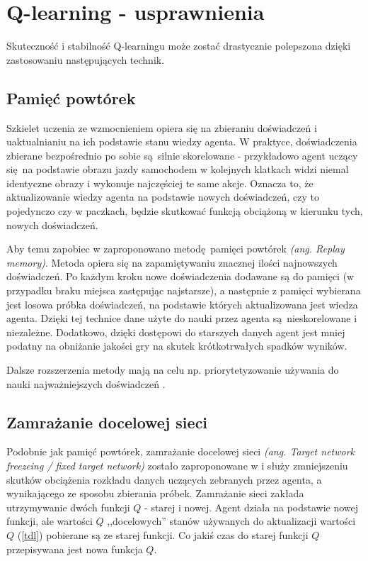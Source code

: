 \documentclass[polish,master,a4paper,oneside]{ppfcmthesis}
\begin{document}
 \section{Q-learning - usprawnienia}\label{enhancements}
Skuteczność i stabilność Q-learningu może zostać drastycznie polepszona dzięki zastosowaniu następujących technik.

\subsection{Pamięć powtórek}\label{replaymemory}

Szkielet uczenia ze wzmocnieniem opiera się na zbieraniu doświadczeń i uaktualnianiu na ich podstawie stanu wiedzy agenta. W praktyce, doświadczenia zbierane bezpośrednio po sobie są silnie skorelowane - przykładowo agent uczący się na podstawie obrazu jazdy samochodem w kolejnych klatkach widzi niemal identyczne obrazy i wykonuje najczęściej te same akcje. Oznacza to, że aktualizowanie wiedzy agenta na podstawie nowych doświadczeń, czy to pojedynczo czy w paczkach, będzie skutkować funkcją obciążoną w kierunku tych, nowych doświadczeń.

Aby temu zapobiec w \cite{mnih2015human} zaproponowano metodę pamięci powtórek \textit{(ang. Replay memory)}. Metoda opiera się na zapamiętywaniu znacznej ilości najnowszych doświadczeń. Po każdym kroku nowe doświadczenia dodawane są do pamięci (w przypadku braku miejsca zastępując najstarsze), a następnie z pamięci wybierana jest losowa próbka doświadczeń, na podstawie których aktualizowana jest wiedza agenta. Dzięki tej technice dane użyte do nauki przez agenta są nieskorelowane i niezależne. Dodatkowo, dzięki dostępowi do starszych danych agent jest mniej podatny na obniżanie jakości gry na skutek krótkotrwałych spadków wyników.

Dalsze rozszerzenia metody mają na celu np. priorytetyzowanie używania do nauki najważniejszych doświadczeń \cite{DBLP:journals/corr/SchaulQAS15}.
\subsection{Zamrażanie docelowej sieci}\label{fixedtarget}

Podobnie jak pamięć powtórek, zamrażanie docelowej sieci \textit{(ang. Target network freezeing / fixed target network)} zostało zaproponowane w \cite{mnih2015human} i służy zmniejszeniu skutków obciążenia rozkładu danych uczących zebranych przez agenta, a wynikającego ze sposobu zbierania próbek. Zamrażanie sieci zakłada utrzymywanie dwóch funkcji $Q$ - starej i nowej. Agent działa na podstawie nowej funkcji, ale wartości $Q$ ,,docelowych'' stanów używanych do aktualizacji wartości $Q$ (\ref{tdl}) pobierane są ze starej funkcji. Co jakiś czas do starej funkcji $Q$ przepisywana jest nowa funkcja $Q$.
\end{document}
